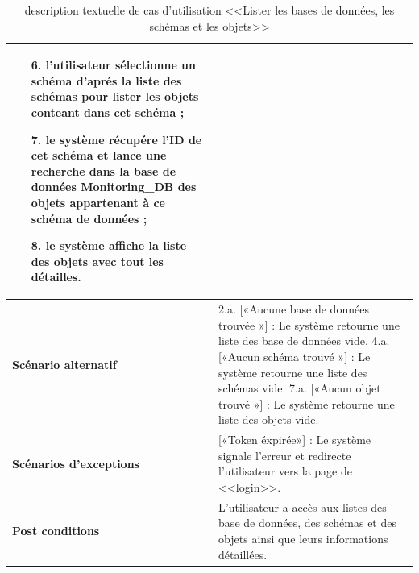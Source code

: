\begin{enumerate}
\begin{table}[H]
\begin{tabular}{|p{3.5cm}|p{12cm}|}
\begin{enumerate}
                    \item [6.] l'utilisateur sélectionne un schéma d'aprés la liste des schémas pour lister les objets conteant dans cet schéma ;
                    \item [7.] le système récupére l'ID de cet schéma et lance une recherche dans la base de données Monitoring\_DB des objets appartenant à ce schéma de données ;
                    \item [8.] le système affiche la liste des objets avec tout les détailles.
                \end{enumerate}\\
                    \hline \textbf{Scénario alternatif} & 
                    2.a. \hspace{0.3cm} [«Aucune base de données trouvée »] : Le système retourne une liste des base de données vide.
                    4.a. \hspace{0.3cm} [«Aucun schéma trouvé »] : Le système retourne une liste des schémas vide.
                    7.a. \hspace{0.3cm} [«Aucun objet trouvé »] : Le système retourne une liste des objets vide.\\
            \hline  \textbf{Scénarios d'exceptions} & 
              [«Token éxpirée»] : Le système signale l'erreur et redirecte l'utilisateur vers la page de <<login>>.\\
            \hline \textbf{Post conditions} & L'utilisateur a accès aux listes des base de données, des schémas et des objets ainsi que leurs informations détaillées.\\
            \hline 
        \end{tabular}
        \caption{description textuelle de cas d'utilisation <<Lister les bases de données, les schémas et les objets>>}
        \end{table}
\end{enumerate}
